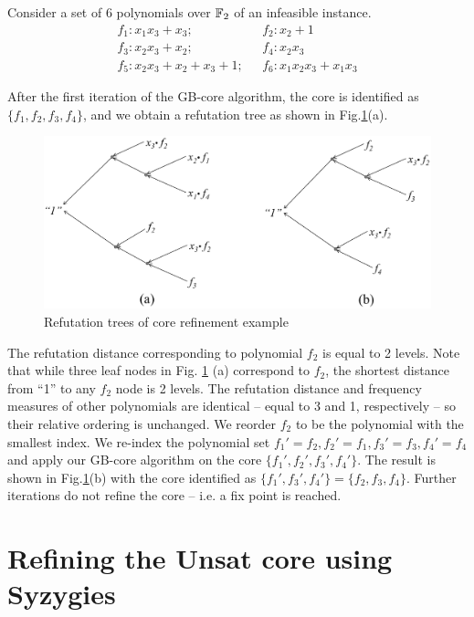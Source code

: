 \begin{Example} 
Consider a set of 6 polynomials over ${\mathbb{F}}_2$ of an
infeasible instance.
\begin{align*}
f_1: x_1x_3+x_3; & ~~~f_2: x_2 + 1\\
f_3: x_2x_3+x_2; & ~~~f_4: x_2x_3\\
f_5: x_2x_3 + x_2 + x_3 + 1; & ~~~f_6 : x_1x_2x_3 +x_1x_3
\end{align*}

After the first iteration of the GB-core algorithm, the core is
identified as $\{f_1, f_2,f_3,f_4\}$, and we obtain a
refutation tree as shown in Fig.\ref{fig:refine}(a).  
\begin{figure}[hbt]
\centering
\includegraphics[width=\textwidth]{newfig/core_refine.eps}
\caption{Refutation trees of core refinement example}
\label{fig:refine}
\end{figure}

The refutation distance corresponding to polynomial $f_2$ is equal to
2 levels. Note that while three leaf nodes in Fig. \ref{fig:refine} (a)
correspond to $f_2$, the shortest distance from ``1'' to any $f_2$
node is 2 levels. The refutation distance and frequency measures of
other polynomials are identical -- equal to 3 and 1, respectively --
so their relative ordering is unchanged. We reorder $f_2$ to be the
polynomial with the  smallest index. We re-index the polynomial set 
$f_1'=f_2, f_2' = f_1, f_3' = f_3, f_4' = f_4$
and apply our GB-core algorithm on the core
$\{f_1',f_2',f_3',f_4'\}$. The result is shown in
Fig.\ref{fig:refine}(b) with the core identified as $\{f_1', f_3',
f_4'\} = \{f_2,f_3,f_4\}$. Further iterations do not refine the core
-- i.e. a fix point is reached. 
\end{Example}

\section{Refining the Unsat core using Syzygies}
\label{sec:syz}


